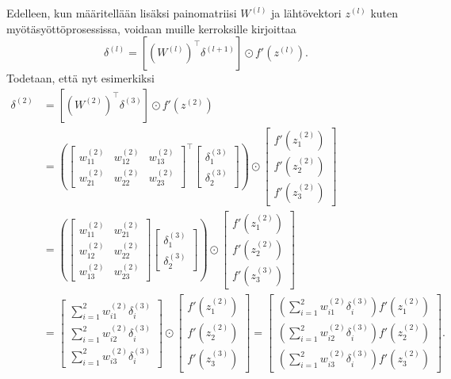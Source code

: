 \documentclass[12pt,a4paper,finnish,oneside,titlepage]{article}
\theoremstyle{plain}
\theoremstyle{definition}
\theoremstyle{remark}
\begin{document}
Edelleen, kun määritellään lisäksi painomatriisi \(W^{(l)}\) ja lähtövektori \(z^{(l)}\) kuten myötäsyöttöprosessissa, voidaan muille kerroksille kirjoittaa \[\delta^{(l)}=\left[(W^{(l)})^{\top} \delta^{(l+1)}\right]\odot f'(z^{(l)}).\]
Todetaan, että nyt esimerkiksi \[\begin{align*}
\delta^{(2)}&=\left[(W^{(2)})^{\top} \delta^{(3)}\right]\odot f'(z^{(2)})\\
&=\left( \begin{bmatrix} w_{11}^{(2)} & w_{12}^{(2)} & w_{13}^{(2)} \\ w_{21}^{(2)} & w_{22}^{(2)} & w_{23}^{(2)} \end{bmatrix}^{\top} \begin{bmatrix} \delta_1^{(3)} \\ \delta_2^{(3)}\end{bmatrix}\right) \odot \begin{bmatrix} f'(z_1^{(2)}) \\ f'(z_2^{(2)}) \\ f'(z_3^{(2)}) \end{bmatrix}\\
&=\left( \begin{bmatrix} w_{11}^{(2)} & w_{21}^{(2)} \\
w_{12}^{(2)} & w_{22}^{(2)} \\ w_{13}^{(2)} & w_{23}^{(2)}
\end{bmatrix} \begin{bmatrix} \delta_1^{(3)} \\ \delta_2^{(3)}\end{bmatrix}\right) \odot \begin{bmatrix} f'(z_1^{(2)}) \\ f'(z_2^{(2)}) \\ f'(z_3^{(3)}) \end{bmatrix}\\
&=\begin{bmatrix}\displaystyle
\sum_{i=1}^{2} w_{i1}^{(2)} \delta_i^{(3)}\\
\displaystyle \sum_{i=1}^{2} w_{i2}^{(2)} \delta_i^{(3)}\\
\displaystyle \sum_{i=1}^{2} w_{i3}^{(2)} \delta_i^{(3)}
\end{bmatrix}\odot \begin{bmatrix} f'(z_1^{(2)}) \\ f'(z_2^{(2)}) \\ f'(z_3^{(3)}) \end{bmatrix}
=\begin{bmatrix}\displaystyle
\left(\sum_{i=1}^{2} w_{i1}^{(2)} \delta_i^{(3)}\right) f'(z_1^{(2)})\\
\displaystyle \left(\sum_{i=1}^{2} w_{i2}^{(2)} \delta_i^{(3)}\right) f'(z_2^{(2)})\\
\displaystyle \left(\sum_{i=1}^{2} w_{i3}^{(2)} \delta_i^{(3)}\right) f'(z_3^{(2)})
\end{bmatrix}.
\end{align*}\]
\end{document}
